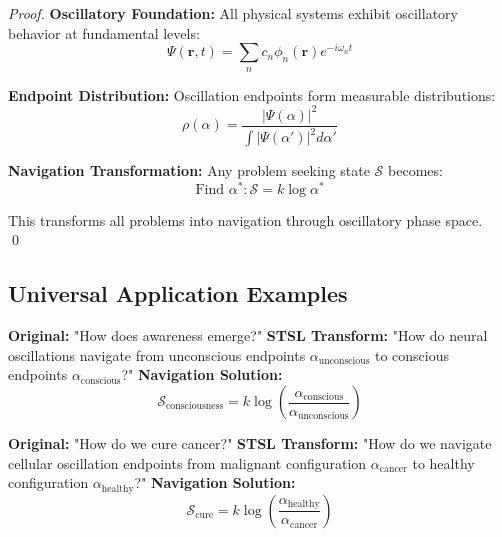 \documentclass[12pt,a4paper]{article}
\begin{document}
\begin{proof}
\textbf{Oscillatory Foundation:}
All physical systems exhibit oscillatory behavior at fundamental levels:
\begin{equation}
\Psi(\mathbf{r}, t) = \sum_{n} c_n \phi_n(\mathbf{r}) e^{-i\omega_n t}
\end{equation}

\textbf{Endpoint Distribution:}
Oscillation endpoints form measurable distributions:
\begin{equation}
\rho(\alpha) = \frac{|\Psi(\alpha)|^2}{\int |\Psi(\alpha')|^2 d\alpha'}
\end{equation}

\textbf{Navigation Transformation:}
Any problem seeking state $\mathcal{S}$ becomes:
\begin{equation}
\text{Find } \alpha^* : \mathcal{S} = k \log \alpha^*
\end{equation}

This transforms all problems into navigation through oscillatory phase space. \qed
\end{proof}

\subsection{Universal Application Examples}

\begin{example}
\textbf{Original:} "How does awareness emerge?"
\textbf{STSL Transform:} "How do neural oscillations navigate from unconscious endpoints $\alpha_{\text{unconscious}}$ to conscious endpoints $\alpha_{\text{conscious}}$?"
\textbf{Navigation Solution:}
\begin{equation}
\mathcal{S}_{\text{consciousness}} = k \log\left(\frac{\alpha_{\text{conscious}}}{\alpha_{\text{unconscious}}}\right)
\end{equation}
\end{example}

\begin{example}
\textbf{Original:} "How do we cure cancer?"
\textbf{STSL Transform:} "How do we navigate cellular oscillation endpoints from malignant configuration $\alpha_{\text{cancer}}$ to healthy configuration $\alpha_{\text{healthy}}$?"
\textbf{Navigation Solution:}
\begin{equation}
\mathcal{S}_{\text{cure}} = k \log\left(\frac{\alpha_{\text{healthy}}}{\alpha_{\text{cancer}}}\right)
\end{equation}
\end{example}
\end{document}
